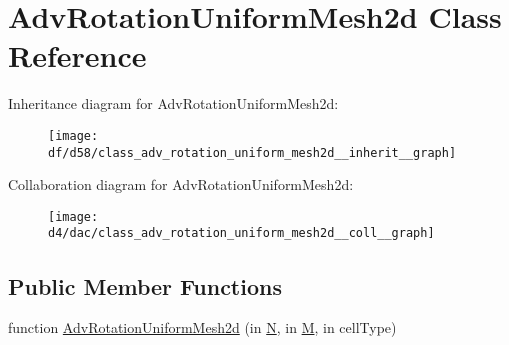 \hypertarget{class_adv_rotation_uniform_mesh2d}{}\section{Adv\+Rotation\+Uniform\+Mesh2d Class Reference}
\label{class_adv_rotation_uniform_mesh2d}


Inheritance diagram for Adv\+Rotation\+Uniform\+Mesh2d\+:
\nopagebreak
\begin{figure}[H]
\begin{center}
\leavevmode
\texttt{[image: df/d58/class\_adv\_rotation\_uniform\_mesh2d\_\_inherit\_\_graph]}
\end{center}
\end{figure}


Collaboration diagram for Adv\+Rotation\+Uniform\+Mesh2d\+:
\nopagebreak
\begin{figure}[H]
\begin{center}
\leavevmode
\texttt{[image: d4/dac/class\_adv\_rotation\_uniform\_mesh2d\_\_coll\_\_graph]}
\end{center}
\end{figure}
\subsection*{Public Member Functions}
\begin{DoxyCompactItemize}
\item 
function \hyperlink{class_adv_rotation_uniform_mesh2d_a97836190205ea9f52a1d88fb0bcf5af3}{Adv\+Rotation\+Uniform\+Mesh2d} (in \hyperlink{class_adv_rotation_uniform_mesh2d_a10a366e7084faf231cd15555c8f48956}{N}, in \hyperlink{class_adv_rotation_uniform_mesh2d_a6ae00c25344d111a585e32e30954b63b}{M}, in cell\+Type)
\end{DoxyCompactItemize}
